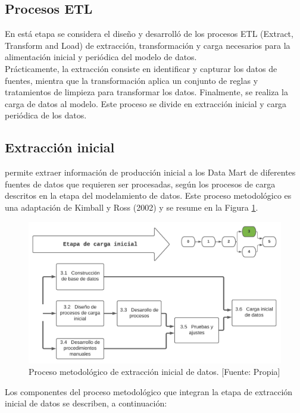 \documentclass[11pt,titlepage]{report}
\begin{document}
\subsection{Procesos ETL}
En está etapa se considera el diseño y desarrolló de los procesos ETL (Extract, Transform and Load) de extracción, transformación y carga necesarios para la alimentación inicial y periódica del modelo de datos.\\

Prácticamente, la extracción consiste en identificar y capturar los datos de fuentes, mientra que la transformación aplica un conjunto de reglas y tratamientos de limpieza para transformar los datos. Finalmente, se realiza la carga de datos al modelo. Este proceso se divide en extracción inicial y carga periódica de los datos.\\

\subsection{Extracción inicial}

permite extraer información de producción inicial a los Data Mart de diferentes fuentes de datos que requieren ser procesadas, según los procesos de carga descritos en la etapa del modelamiento de datos. Este proceso metodológico es una adaptación de Kimball y Ross (2002) y se resume en la Figura \ref{fig: etapa3}.

\begin{figure}[h]
	\centering
	\includegraphics[width=1\linewidth]{Figuras/etapa3}
	\caption{Proceso metodológico de extracción inicial de datos. [Fuente: Propia]}
	\label{fig: etapa3}
\end{figure}

Los componentes del proceso metodológico que integran la etapa de extracción inicial de datos se describen, a continuación:
\end{document}
